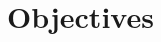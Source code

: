 \documentclass[a4paper,11pt]{article}
\begin{document}

\section{Objectives}
\label{sec:objective}
\end{document}
